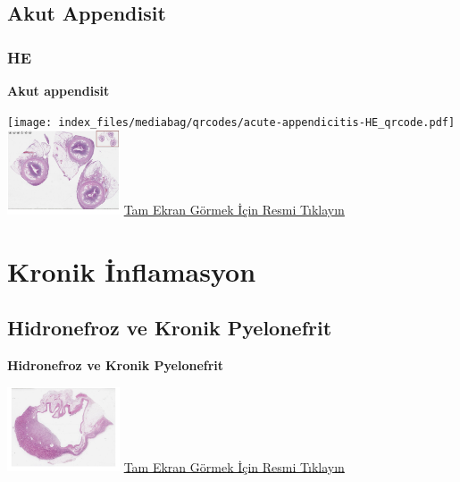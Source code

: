 \documentclass[
  letterpaper,
  DIV=11,
  numbers=noendperiod]{scrreprt}
\begin{document}
\hypertarget{sec-akut-appendisit}{%
\section{Akut Appendisit}\label{sec-akut-appendisit}}

\hypertarget{he-3}{%
\subsection{HE}\label{he-3}}

\textbf{Akut appendisit}

\texttt{[image: index\_files/mediabag/qrcodes/acute-appendicitis-HE\_qrcode.pdf]}
\href{https://images.patolojiatlasi.com/acute-appendicitis/HE.html}{\includegraphics[width=0.25\textwidth,height=\textheight]{./screenshots/thumbnail_acute-appendicitis.png}}
\href{https://images.patolojiatlasi.com/acute-appendicitis/HE.html}{Tam
Ekran Görmek İçin Resmi Tıklayın}

\hypertarget{sec-kronik-inflamasyon}{%
\chapter{Kronik İnflamasyon}\label{sec-kronik-inflamasyon}}

\hypertarget{sec-hidronefroz-kronik-pyelonefrit}{%
\section{Hidronefroz ve Kronik
Pyelonefrit}\label{sec-hidronefroz-kronik-pyelonefrit}}

\textbf{Hidronefroz ve Kronik Pyelonefrit}

\href{https://images.patolojiatlasi.com/chronicpyelonephritis/HE1.html}{\includegraphics[width=0.25\textwidth,height=\textheight]{./screenshots/thumbnail_chronicpyelonephritis-1.png}}
\href{https://images.patolojiatlasi.com/chronicpyelonephritis/HE1.html}{Tam
Ekran Görmek İçin Resmi Tıklayın}
\end{document}
